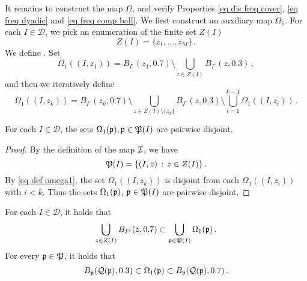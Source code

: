 It remains to construct the map $\Omega$, and verify Properties \eqref{eq dis freq cover}, \eqref{eq freq dyadic} and
\eqref{eq freq comp ball}. We first construct an auxiliary map $\Omega_1$. For each $I \in \mathcal{D}$, we pick an enumeration of the finite set $Z(I)$
$$
    Z(I) = \{z_1, \dotsc, z_M\}\,.
$$
We define . Set
$$
    \Omega_1((I, z_1)) = B_{I^\circ}(z_1, 0.7) \setminus \bigcup_{z \in Z(I)} B_{I^\circ}(z, 0.3)\,,
$$
and then we iteratively define
\begin{equation}
    \label{eq def omega1}
    \Omega_1((I, z_k)) = B_{I^\circ}(z_k, 0.7) \setminus \bigcup_{z \in Z(I) \setminus \{z_k\}} B_{I^\circ}(z, 0.3) \setminus \bigcup_{i=1}^{k-1} \Omega_1((I, z_i))\,.
\end{equation}
\begin{lemma}
    \label{lem omega1 disj}
    For each $I \in \mathcal{D}$, the sets $\Omega_1(\fp), \fp \in \fP(I)$ are pairwise disjoint. 
\end{lemma}

\begin{proof}
    By the definition of the map $\sc$, we have
    $$
        \fP(I) = \{(I, z) \, : \, z \in Z(I)\}\,.
    $$
    By \eqref{eq def omega1}, the set $\Omega_1((I, z_k))$ is disjoint from each $\Omega_1((I, z_i))$ with $i < k$. Thus the sets $\Omega_1(\fp)$, $\fp \in \fP(I)$ are pairwise disjoint.
\end{proof}

\begin{lemma}
    For each $I \in \mathcal{D}$, it holds that
    \begin{equation}
    \label{eq omega1 cover}
            \bigcup_{z \in Z(I)} B_{I^\circ}(z, 0.7)\subset \bigcup_{\fp \in \fP(I)} \Omega_1(\fp)\,.
    \end{equation}
    For every $\fp \in \fP$, it holds that
    \begin{equation}
        \label{eq omega1 incl}
        B_{\fp}(\fcc(\fp), 0.3) \subset \Omega_1(\fp) \subset B_{\fp}(\fcc(\fp), 0.7)\,.
    \end{equation}
\end{lemma}

